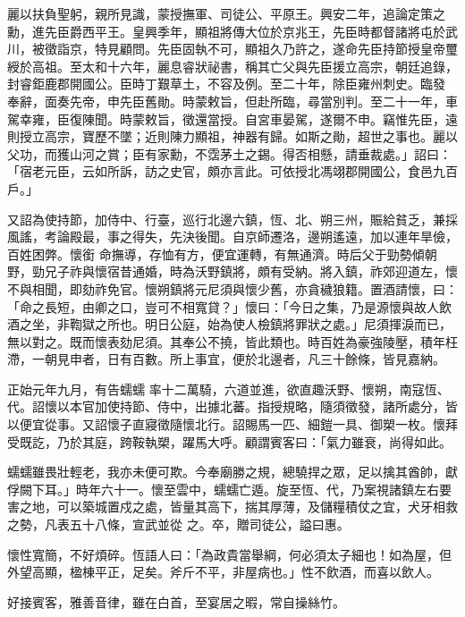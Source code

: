 \begin{pinyinscope}
 麗以扶負聖躬，親所見識，蒙授撫軍、司徒公、平原王。興安二年，追論定策之勳，進先臣爵西平王。皇興季年，顯祖將傳大位於京兆王，先臣時都督諸將屯於武川，被徵詣京，特見顧問。先臣固執不可，顯祖久乃許之，遂命先臣持節授皇帝璽綬於高祖。至太和十六年，麗息睿狀祕書，稱其亡父與先臣援立高宗，朝廷追錄，封睿鉅鹿郡開國公。臣時丁艱草土，不容及例。至二十年，除臣雍州刺史。臨發
 奉辭，面奏先帝，申先臣舊勛。時蒙敕旨，但赴所臨，尋當別判。至二十一年，車駕幸雍，臣復陳聞。時蒙敕旨，徵還當授。自宮車晏駕，遂爾不申。竊惟先臣，遠則授立高宗，寶歷不墜；近則陳力顯祖，神器有歸。如斯之勛，超世之事也。麗以父功，而獲山河之賞；臣有家勳，不霑茅土之錫。得否相懸，請垂裁處。」詔曰：「宿老元臣，云如所訴，訪之史官，頗亦言此。可依授北馮翊郡開國公，食邑九百戶。」



 又詔為使持節，加侍中、行臺，巡行北邊六鎮，恆、北、朔三州，賑給貧乏，兼採風謠，考論殿最，事之得失，先決後聞。自京師遷洛，邊朔遙遠，加以連年旱儉，百姓困弊。懷銜
 命撫導，存恤有方，便宜運轉，有無通濟。時后父于勁勢傾朝野，勁兄子祚與懷宿昔通婚，時為沃野鎮將，頗有受納。將入鎮，祚郊迎道左，懷不與相聞，即劾祚免官。懷朔鎮將元尼須與懷少舊，亦貪穢狼籍。置酒請懷，曰：「命之長短，由卿之口，豈可不相寬貸？」懷曰：「今日之集，乃是源懷與故人飲酒之坐，非鞫獄之所也。明日公庭，始為使人檢鎮將罪狀之處。」尼須揮淚而已，無以對之。既而懷表劾尼須。其奉公不撓，皆此類也。時百姓為豪強陵壓，積年枉滯，一朝見申者，日有百數。所上事宜，便於北邊者，凡三十餘條，皆見嘉納。



 正始元年九月，有告蠕蠕
 率十二萬騎，六道並進，欲直趣沃野、懷朔，南寇恆、代。詔懷以本官加使持節、侍中，出據北蕃。指授規略，隨須徵發，諸所處分，皆以便宜從事。又詔懷子直寢徵隨懷北行。詔賜馬一匹、細鎧一具、御槊一枚。懷拜受既訖，乃於其庭，跨鞍執槊，躍馬大呼。顧謂賓客曰：「氣力雖衰，尚得如此。



 蠕蠕雖畏壯輕老，我亦未便可欺。今奉廟勝之規，總驍捍之眾，足以擒其酋帥，獻俘闕下耳。」時年六十一。懷至雲中，蠕蠕亡遁。旋至恆、代，乃案視諸鎮左右要害之地，可以築城置戍之處，皆量其高下，揣其厚薄，及儲糧積仗之宜，犬牙相救之勢，凡表五十八條，宣武並從
 之。卒，贈司徒公，謚曰惠。



 懷性寬簡，不好煩碎。恆語人曰：「為政貴當舉綱，何必須太子細也！如為屋，但外望高顯，楹棟平正，足矣。斧斤不平，非屋病也。」性不飲酒，而喜以飲人。



 好接賓客，雅善音律，雖在白首，至宴居之暇，常自操絲竹。




\end{pinyinscope}
